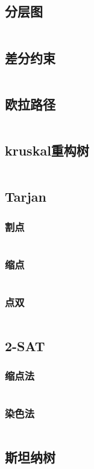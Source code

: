\documentclass[a4paper,11pt]{article}
\begin{document}
\subsection{分层图}
\inputminted[breaklines]{c++}{图论/分层图.cpp}
\subsection{差分约束}
\inputminted[breaklines]{c++}{图论/差分约束.cpp}
\subsection{欧拉路径}
\inputminted[breaklines]{c++}{图论/欧拉路径.cpp}
\subsection{kruskal重构树}
\inputminted[breaklines]{c++}{图论/kruskal重构树.cpp}
\subsection{Tarjan}
\subsubsection{割点}
\inputminted[breaklines]{c++}{图论/割点.cpp}
\subsubsection{缩点}
\inputminted[breaklines]{c++}{图论/缩点.cpp}
\subsubsection{点双}
\inputminted[breaklines]{c++}{图论/点双.cpp}
\subsection{2-SAT}
\subsubsection{缩点法}
\inputminted[breaklines]{c++}{图论/2-SAT缩点法.cpp}
\subsubsection{染色法}
\inputminted[breaklines]{c++}{图论/2-SAT染色法.cpp}
\subsection{斯坦纳树}
\inputminted[breaklines]{c++}{图论/斯坦纳树.cpp}
\end{document}
